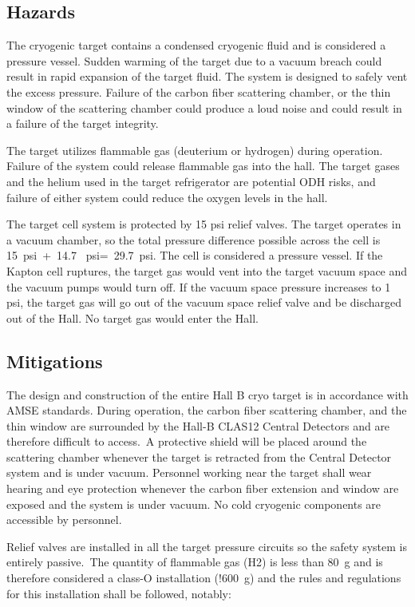  \subsection{Hazards} 

The cryogenic target contains a condensed cryogenic fluid and is considered a pressure vessel. Sudden warming of the target due to a vacuum breach could result in rapid expansion of the target fluid. The system is designed to safely vent the excess pressure. Failure of the carbon fiber scattering chamber, or the thin window of the scattering chamber could produce a loud noise and could result in a failure of the target integrity.

The target utilizes flammable gas (deuterium or hydrogen) during operation. Failure of the system could release flammable gas into the hall. The target gases and the helium used in the target refrigerator are potential ODH risks, and failure of either system could reduce the oxygen levels in the hall.

The target cell system is protected by 15 psi relief valves.  The target operates in a vacuum chamber, so the total pressure difference possible across the cell is 15~psi~+~14.7 ~psi=~29.7~psi. The cell is considered a pressure vessel. If the Kapton cell ruptures, the target gas would vent into the target vacuum space and the vacuum pumps would turn off. If the vacuum space pressure increases to 1 psi, the target gas will go out of the vacuum space relief valve and be discharged out of the Hall. No target gas would enter the Hall.

\subsection{Mitigations}

The design and construction of the entire Hall B cryo target is in accordance with AMSE standards. During operation, the carbon fiber scattering chamber, and the thin window are surrounded by the Hall-B CLAS12 Central Detectors and are therefore difficult to access.~A protective shield will be placed around the scattering chamber whenever the target is retracted from the Central Detector system and is under vacuum.  Personnel working near the target shall wear hearing and eye protection whenever the carbon fiber extension and window are exposed and the system is under vacuum. No cold cryogenic components are accessible by personnel.

Relief valves are installed in all the target pressure circuits so the safety system is entirely passive.~The quantity of flammable gas (H2) is less than 80~g and is therefore considered a class-O installation (!600~g) and the rules and regulations for this installation shall be followed, notably:

